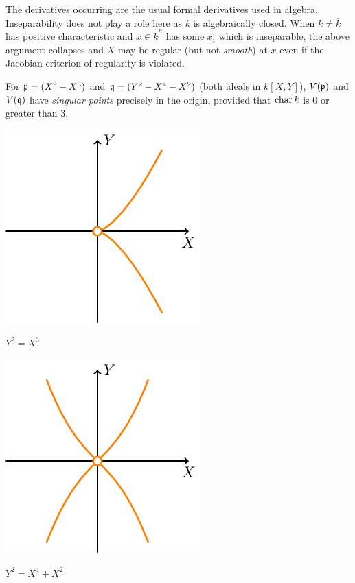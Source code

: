 \documentclass[a4paper,parskip=half,numbers=enddot, DIV=12]{scrreprt}
\begin{document}
\begin{rem*}
    The derivatives occurring are the usual formal derivatives used in algebra. Inseparability does not play a role here as $k$ is algebraically closed. When $k\neq \overline{k}$ has positive characteristic and $x\in \overline{k}^n$ has some $x_i$ which is inseparable, the above argument collapses and $X$ may be regular (but not \emph{smooth}) at $x$ even if the Jacobian criterion of regularity is violated.
\end{rem*}
\begin{example*}
    For $\mathfrak{p}= (X^2-X^3)$ and $\mathfrak{q} = (Y^2-X^4-X^2)$ (both ideals in $k[X,Y]$), $V(\mathfrak{p})$ and $V(\mathfrak{q})$ have \emph{singular points} precisely in the origin, provided that $\operatorname{char} k$ is 0 or greater than 3.
\end{example*}
\begin{center}
	\begin{minipage}{0.42\textwidth}
		\centering
		\includegraphics{Curve1.pdf}
		
		$Y^2=X^3$
	\end{minipage}
	\begin{minipage}{0.42\textwidth}
		\centering
		\includegraphics{Curve2.pdf}
		
		$Y^2=X^4+X^2$
	\end{minipage}
\end{center}
\end{document}
